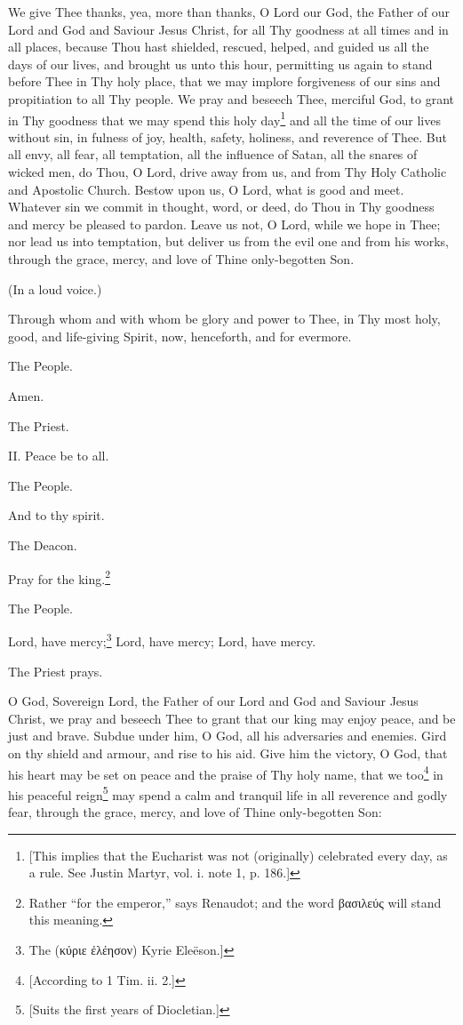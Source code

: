 We give Thee thanks, yea, more than thanks, O Lord our God, the Father of our Lord and God and Saviour Jesus Christ, for all Thy goodness at all times and in all places, because Thou hast shielded, rescued, helped, and guided us all the days of our lives, and brought us unto this hour, permitting us again to stand before Thee in Thy holy place, that we may implore forgiveness of our sins and propitiation to all Thy people. We pray and beseech Thee, merciful God, to grant in Thy goodness that we may spend this holy day\footnote{\par{}  [This implies that the Eucharist was not (originally) celebrated every day, as a rule. See Justin Martyr, vol. i. note 1, p. 186.]} and all the time of our lives without sin, in fulness of joy, health, safety, holiness, and reverence of Thee. But all envy, all fear, all temptation, all the influence of Satan, all the snares of wicked men, do Thou, O Lord, drive away from us, and from Thy Holy Catholic and Apostolic Church. Bestow upon us, O Lord, what is good and meet. Whatever sin we commit in thought, word, or deed, do Thou in Thy goodness and mercy be pleased to pardon. Leave us not, O Lord, while we hope in Thee; nor lead us into temptation, but deliver us from the evil one and from his works, through the grace, mercy, and love of Thine only-begotten Son.

(In a loud voice.)

Through whom and with whom be glory and power to Thee, in Thy most holy, good, and life-giving Spirit, now, henceforth, and for evermore.

The People.

Amen.

The Priest.

II. Peace be to all.

The People.

And to thy spirit.

The Deacon.

Pray for the king.\footnote{\par  Rather “for the emperor,” says Renaudot; and the word \textgreek{βασιλεύς} will stand this meaning.}

The People.

Lord, have mercy;\footnote{\par  The (\textgreek{κύριε ἐλέησον}) Kyrie Eleëson.]} Lord, have mercy; Lord, have mercy.

The Priest prays.

O God, Sovereign Lord, the Father of our Lord and God and Saviour Jesus Christ, we pray and beseech Thee to grant that our king may enjoy peace, and be just and brave. Subdue under him, O God, all his adversaries and enemies. Gird on thy shield and armour, and rise to his aid. Give him the victory, O God, that his heart may be set on peace and the praise of Thy holy name, that we too\footnote{\par{}  [According to 1 Tim. ii. 2.]} in his peaceful reign\footnote{\par{}  [Suits the first years of Diocletian.]} may spend a calm and tranquil life in all reverence and godly fear, through the grace, mercy, and love of Thine only-begotten Son:


